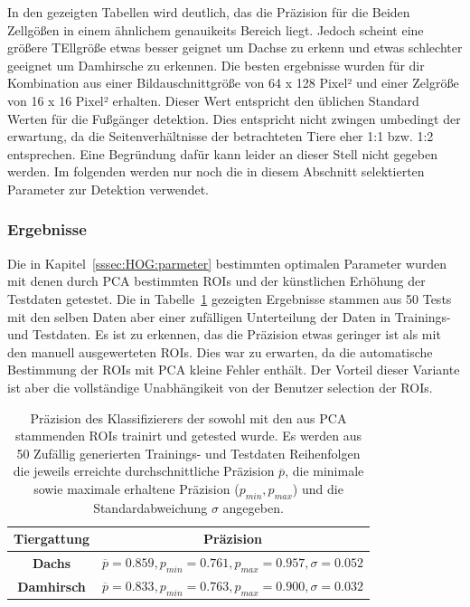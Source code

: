 In den gezeigten Tabellen wird deutlich, das die Präzision für die Beiden Zellgößen in einem ähnlichem genauikeits Bereich liegt. Jedoch scheint eine größere TEllgröße etwas besser geignet um Dachse zu erkenn und etwas schlechter geeignet um Damhirsche zu erkennen. Die besten ergebnisse wurden für dir Kombination aus einer Bildauschnittgröße von 64 x 128 Pixel² und einer Zelgröße von 16 x 16 Pixel² erhalten. Dieser Wert entspricht den üblichen Standard Werten für die Fußgänger detektion. Dies entspricht nicht zwingen umbedingt der erwartung, da die Seitenverhältnisse der betrachteten Tiere eher 1:1 bzw. 1:2 entsprechen. Eine Begründung dafür kann leider an dieser Stell nicht gegeben werden. Im folgenden werden nur noch die in diesem Abschnitt selektierten Parameter zur Detektion verwendet.

\subsubsection{Ergebnisse}
Die in Kapitel~\ref{sssec:HOG:parmeter} bestimmten optimalen Parameter wurden mit denen durch PCA bestimmten ROIs und der künstlichen Erhöhung der Testdaten getestet. Die in Tabelle~\ref{tab:HOG:Results} gezeigten Ergebnisse stammen aus 50 Tests mit den selben Daten aber einer zufälligen Unterteilung der Daten in Trainings- und Testdaten. Es ist zu erkennen, das die Präzision etwas geringer ist als mit den manuell ausgewerteten ROIs. Dies war zu erwarten, da die automatische Bestimmung der ROIs mit PCA kleine Fehler enthält. Der Vorteil dieser Variante ist aber die vollständige Unabhängikeit von der Benutzer selection der ROIs. 
\begin{table}[] \label{tab:HOG:Results}
\centering
\caption{Präzision des Klassifizierers der sowohl mit den aus PCA stammenden ROIs trainirt und getested wurde. Es werden aus 50 Zufällig generierten Trainings- und Testdaten Reihenfolgen die jeweils erreichte durchschnittliche Präzision $\overline{p}$, die minimale sowie maximale erhaltene Präzision ($p_{min}, p_{max}$) und die Standardabweichung $\sigma$ angegeben. }
\begin{tabular}{cl}
\hline
\textbf{Tiergattung} 	       & \multicolumn{1}{c}{\textbf{Präzision}}                                                                                                                                                  \\ \hline
\textbf{Dachs}                         &$\overline{p}= 0.859, p_{min}=0.761, p_{max}=0.957, \sigma=0.052$ \\
\textbf{Damhirsch}                &$\overline{p}=0.833, p_{min}=0.763, p_{max}=0.900, \sigma=0.032$ \\
\hline
\end{tabular}
\end{table}



